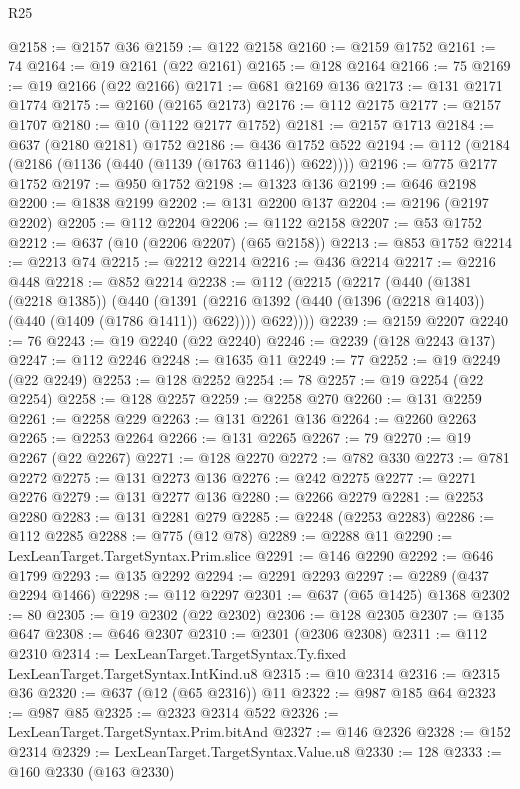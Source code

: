 \begin{lexlean}{R25}
\begin{coremodule}
@2158 := @2157 @36
@2159 := @122 @2158
@2160 := @2159 @1752
@2161 := 74
@2164 := @19 @2161 (@22 @2161)
@2165 := @128 @2164
@2166 := 75
@2169 := @19 @2166 (@22 @2166)
@2171 := @681 @2169 @136
@2173 := @131 @2171 @1774
@2175 := @2160 (@2165 @2173)
@2176 := @112 @2175
@2177 := @2157 @1707
@2180 := @10 (@1122 @2177 @1752)
@2181 := @2157 @1713
@2184 := @637 (@2180 @2181) @1752
@2186 := @436 @1752 @522
@2194 := @112 (@2184 (@2186 (@1136 (@440 (@1139 (@1763 @1146)) @622))))
@2196 := @775 @2177 @1752
@2197 := @950 @1752
@2198 := @1323 @136
@2199 := @646 @2198
@2200 := @1838 @2199
@2202 := @131 @2200 @137
@2204 := @2196 (@2197 @2202)
@2205 := @112 @2204
@2206 := @1122 @2158
@2207 := @53 @1752
@2212 := @637 (@10 (@2206 @2207) (@65 @2158))
@2213 := @853 @1752
@2214 := @2213 @74
@2215 := @2212 @2214
@2216 := @436 @2214
@2217 := @2216 @448
@2218 := @852 @2214
@2238 := @112
    (@2215
      (@2217
        (@440
          (@1381 (@2218 @1385))
          (@440
            (@1391 (@2216 @1392 (@440 (@1396 (@2218 @1403)) (@440 (@1409 (@1786 @1411)) @622))))
            @622))))
@2239 := @2159 @2207
@2240 := 76
@2243 := @19 @2240 (@22 @2240)
@2246 := @2239 (@128 @2243 @137)
@2247 := @112 @2246
@2248 := @1635 @11
@2249 := 77
@2252 := @19 @2249 (@22 @2249)
@2253 := @128 @2252
@2254 := 78
@2257 := @19 @2254 (@22 @2254)
@2258 := @128 @2257
@2259 := @2258 @270
@2260 := @131 @2259
@2261 := @2258 @229
@2263 := @131 @2261 @136
@2264 := @2260 @2263
@2265 := @2253 @2264
@2266 := @131 @2265
@2267 := 79
@2270 := @19 @2267 (@22 @2267)
@2271 := @128 @2270
@2272 := @782 @330
@2273 := @781 @2272
@2275 := @131 @2273 @136
@2276 := @242 @2275
@2277 := @2271 @2276
@2279 := @131 @2277 @136
@2280 := @2266 @2279
@2281 := @2253 @2280
@2283 := @131 @2281 @279
@2285 := @2248 (@2253 @2283)
@2286 := @112 @2285
@2288 := @775 (@12 @78)
@2289 := @2288 @11
@2290 := LexLeanTarget.TargetSyntax.Prim.slice
@2291 := @146 @2290
@2292 := @646 @1799
@2293 := @135 @2292
@2294 := @2291 @2293
@2297 := @2289 (@437 @2294 @1466)
@2298 := @112 @2297
@2301 := @637 (@65 @1425) @1368
@2302 := 80
@2305 := @19 @2302 (@22 @2302)
@2306 := @128 @2305
@2307 := @135 @647
@2308 := @646 @2307
@2310 := @2301 (@2306 @2308)
@2311 := @112 @2310
@2314 := LexLeanTarget.TargetSyntax.Ty.fixed LexLeanTarget.TargetSyntax.IntKind.u8
@2315 := @10 @2314
@2316 := @2315 @36
@2320 := @637 (@12 (@65 @2316)) @11
@2322 := @987 @185 @64
@2323 := @987 @85
@2325 := @2323 @2314 @522
@2326 := LexLeanTarget.TargetSyntax.Prim.bitAnd
@2327 := @146 @2326
@2328 := @152 @2314
@2329 := LexLeanTarget.TargetSyntax.Value.u8
@2330 := 128
@2333 := @160 @2330 (@163 @2330)

\end{coremodule}
\end{lexlean}
